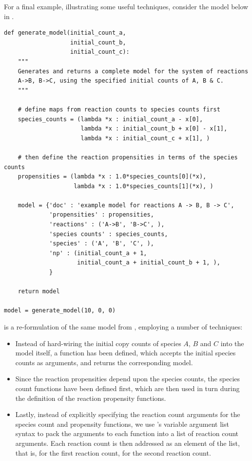 For a final example, illustrating some useful techniques, consider the model
below in .

\begin{lstlisting}[frame=tb,
caption={Automatic generation of models for the sustem
$A \rightarrow B$, $B \rightarrow C$, using specified
initial copy counts of the species $A$, $B$ and $C$.},
label=model2c]
def generate_model(initial_count_a,
                   initial_count_b,
                   initial_count_c):
    """
    Generates and returns a complete model for the system of reactions
    A->B, B->C, using the specified initial counts of A, B & C.
    """
    
    # define maps from reaction counts to species counts first
    species_counts = (lambda *x : initial_count_a - x[0],
                      lambda *x : initial_count_b + x[0] - x[1],
                      lambda *x : initial_count_c + x[1], )
    
    # then define the reaction propensities in terms of the species counts
    propensities = (lambda *x : 1.0*species_counts[0](*x),
                    lambda *x : 1.0*species_counts[1](*x), )
    
    model = {'doc' : 'example model for reactions A -> B, B -> C',
             'propensities' : propensities,
             'reactions' : ('A->B', 'B->C', ),
             'species counts' : species_counts,
             'species' : ('A', 'B', 'C', ),
             'np' : (initial_count_a + 1,
                     initial_count_a + initial_count_b + 1, ),
             }
    
    return model

model = generate_model(10, 0, 0)
\end{lstlisting}

 is a re-formulation of the same model from
, employing a number of techniques:
\begin{itemize}
  \item Instead of hard-wiring the initial copy counts of species $A$, $B$ and
  $C$ into the model itself, a function  has been
  defined, which accepts the initial species counts as arguments, and returns
  the corresponding model.
  \item Since the reaction propensities depend upon the species counts, the
  species count functions have been defined first, which are then used in
  turn during the definition of the reaction propensity functions.
  \item Lastly, instead of explicitly specifying the reaction count arguments
  for the species count and propensity functions, we use \python{}'s variable
  argument list syntax to pack the arguments to each function
  into a list  of reaction count arguments. Each reaction count is then
  addressed as an element of the list, that is,  for the first 
  reaction count,  for the second reaction count.
\end{itemize}

